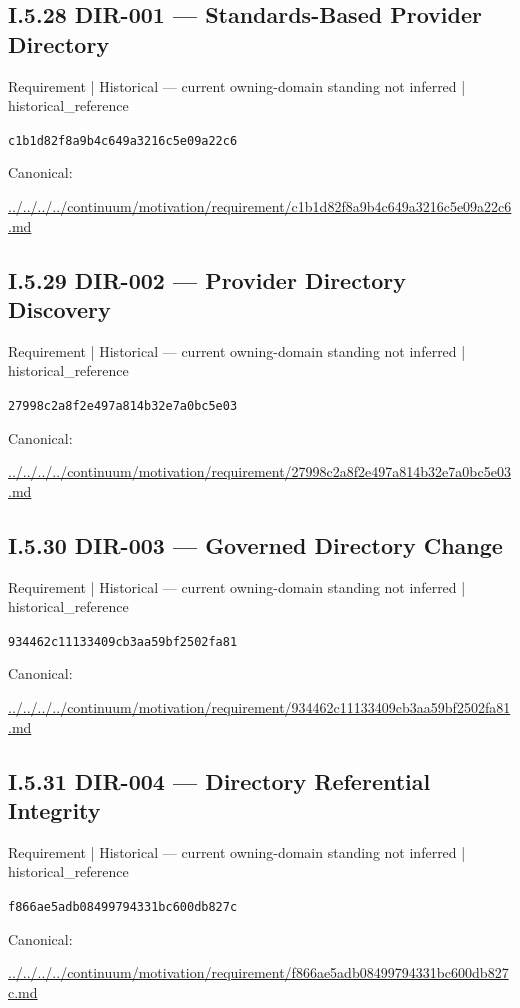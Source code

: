 \documentclass[10pt,a4paper]{article}
\begin{document}
\subsection*{I.5.28 DIR-001 — Standards-Based Provider Directory}
\label{element-c1b1d82f8a9b4c649a3216c5e09a22c6}
{\small Requirement | Historical — current owning-domain standing not inferred | historical\_reference}\par
\texttt{c1b1d82f8a9b4c649a3216c5e09a22c6}\par
Canonical: \par
{\footnotesize\url{../../../../continuum/motivation/requirement/c1b1d82f8a9b4c649a3216c5e09a22c6.md}}\par
\subsection*{I.5.29 DIR-002 — Provider Directory Discovery}
\label{element-27998c2a8f2e497a814b32e7a0bc5e03}
{\small Requirement | Historical — current owning-domain standing not inferred | historical\_reference}\par
\texttt{27998c2a8f2e497a814b32e7a0bc5e03}\par
Canonical: \par
{\footnotesize\url{../../../../continuum/motivation/requirement/27998c2a8f2e497a814b32e7a0bc5e03.md}}\par
\subsection*{I.5.30 DIR-003 — Governed Directory Change}
\label{element-934462c11133409cb3aa59bf2502fa81}
{\small Requirement | Historical — current owning-domain standing not inferred | historical\_reference}\par
\texttt{934462c11133409cb3aa59bf2502fa81}\par
Canonical: \par
{\footnotesize\url{../../../../continuum/motivation/requirement/934462c11133409cb3aa59bf2502fa81.md}}\par
\subsection*{I.5.31 DIR-004 — Directory Referential Integrity}
\label{element-f866ae5adb08499794331bc600db827c}
{\small Requirement | Historical — current owning-domain standing not inferred | historical\_reference}\par
\texttt{f866ae5adb08499794331bc600db827c}\par
Canonical: \par
{\footnotesize\url{../../../../continuum/motivation/requirement/f866ae5adb08499794331bc600db827c.md}}\par
\end{document}
